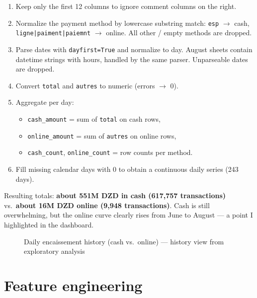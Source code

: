 \documentclass[12pt,a4paper]{report}
\begin{document}
\begin{enumerate}
\item Keep only the first 12 columns to ignore comment columns on the right.
\item Normalize the payment method by lowercase substring match: \texttt{esp} $\rightarrow$ cash, \texttt{ligne|paiment|paiemnt} $\rightarrow$ online. All other / empty methods are dropped.
\item Parse dates with \texttt{dayfirst=True} and normalize to day. August sheets contain datetime strings with hours, handled by the same parser. Unparseable dates are dropped.
\item Convert \texttt{total} and \texttt{autres} to numeric (errors $\rightarrow$ 0).
\item Aggregate per day:
  \begin{itemize}
  \item \texttt{cash\_amount} = sum of \texttt{total} on cash rows,
  \item \texttt{online\_amount} = sum of \texttt{autres} on online rows,
  \item \texttt{cash\_count}, \texttt{online\_count} = row counts per method.
  \end{itemize}
\item Fill missing calendar days with 0 to obtain a continuous daily series (243 days).
\end{enumerate}

Resulting totals: \textbf{about 551M DZD in cash (617,757 transactions)} vs.\ \textbf{about 16M DZD online (9,948 transactions)}. Cash is still overwhelming, but the online curve clearly rises from June to August --- a point I highlighted in the dashboard.

\begin{figure}[H]
\centering
{}
\caption{Daily encaissement history (cash vs.\ online) --- history view from exploratory analysis}
\end{figure}

\section{Feature engineering}
\end{document}
